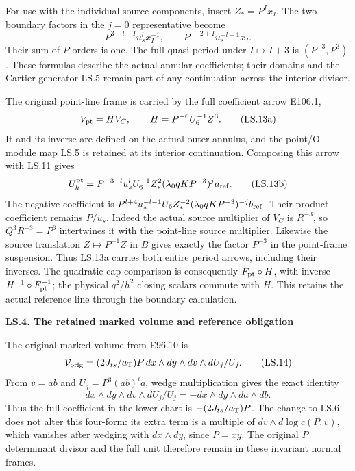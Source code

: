 For use with the individual source components, insert
\(Z_*=P^I x_I\). The two boundary factors in the
\(j=0\) representative become
\[
 P^{3-l-I}u_s^l x_I^{-1},\qquad
 P^{l-2+I}u_s^{-l-1}x_I.
 \tag{LS.13}
\]
Their sum of \(P\)-orders is one. The full quasi-period
under \(I\mapsto I+3\) is \((P^{-3},P^3)\).
These formulas describe the actual annular coefficients;
their domains and the Cartier generator LS.5 remain
part of any continuation across the interior divisor.

The original point-line frame is carried by the full
coefficient arrow E106.1,
\[
 V_{\rm pt}=H V_C,\qquad H=P^{-6}U_6^{-1}Z^3.
 \tag{LS.13a}
\]
It and its inverse are defined on the actual outer
annulus, and the point/O module map LS.5 is retained
at its interior continuation. Composing this arrow
with LS.11 gives
\[
 U_k^{\rm pt}
 =P^{-3-l}u_s^lU_6^{-1}Z_*^2
   (\lambda_0qK P^{-3})^j a_{\rm ref}.
 \tag{LS.13b}
\]
The negative coefficient is
\(P^{l+4}u_s^{-l-1}U_6 Z_*^{-2}
(\lambda_0qK P^{-3})^{-j}b_{\rm ref}\).
Their product coefficient remains \(P/u_s\).
Indeed the actual source multiplier of \(V_C\) is
\(R^{-3}\), so \(Q^3R^{-3}=P^6\) intertwines
it with the point-line source multiplier. Likewise
the source translation \(Z\mapsto P^{-1}Z\) in
\(B\) gives exactly the factor \(P^{-3}\) in
the point-frame suspension. Thus LS.13a carries
both entire period arrows, including their inverses.
The quadratic-cap comparison is consequently
\(F_{\rm pt}\circ H\), with inverse
\(H^{-1}\circ F_{\rm pt}^{-1}\); the physical
\(q^2/h^2\) closing scalars commute with \(H\).
This retains the actual reference line through the
boundary calculation.

\par

\medskip\noindent\textbf{LS.4. The retained marked volume and reference obligation}

\par\nobreak

The original marked volume from E96.10 is
\[
 \mathcal V_{\rm orig}
 =(2J_{ts}/a_{\rm T})P\,
 dx\wedge dy\wedge dv\wedge dU_j/U_j.
 \tag{LS.14}
\]
From \(v=ab\) and \(U_j=P^3(ab)^l a\), wedge multiplication
gives the exact identity
\[
 dx\wedge dy\wedge dv\wedge dU_j/U_j
 =-dx\wedge dy\wedge da\wedge db.
 \tag{LS.15}
\]
Thus the full coefficient in the lower chart is
\(-(2J_{ts}/a_{\rm T})P\). The change to LS.6 does
not alter this four-form: its extra term is a multiple
of \(dv\wedge d\log c(P,v)\), which vanishes after
wedging with \(dx\wedge dy\), since \(P=xy\).
The original \(P\) determinant divisor and the full unit
therefore remain in these invariant normal frames.

